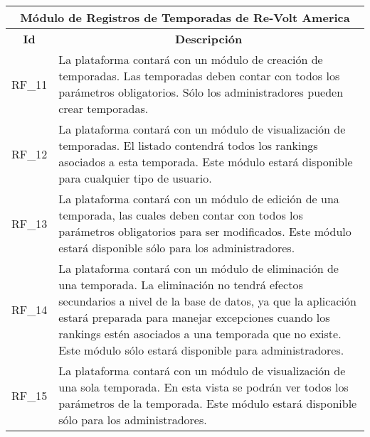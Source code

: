 \begin{center}
	\begin{tabular}{ | l | p{15cm} |}
		\hline
		\multicolumn{2}{|c|}{\textbf{Módulo de Registros de Temporadas de Re-Volt America}} \\
		\hline
		\multicolumn{1}{|c|}{\textbf{Id}} & \multicolumn{1}{|c|}{\textbf{Descripción}} \\
		\hline
		RF\_11 & La plataforma contará con un módulo de creación de temporadas. Las temporadas deben contar con todos los parámetros obligatorios. Sólo los administradores pueden crear temporadas. \\ \hline
		
		RF\_12 & La plataforma contará con un módulo de visualización de temporadas. El listado contendrá todos los rankings asociados a esta temporada. Este módulo estará disponible para cualquier tipo de usuario. \\ \hline
		
		RF\_13 & La plataforma contará con un módulo de edición de una temporada, las cuales deben contar con todos los parámetros obligatorios para ser modificados. Este módulo estará disponible sólo para los administradores. \\ \hline
		
		RF\_14 & La plataforma contará con un módulo de eliminación de una temporada. La eliminación no tendrá efectos secundarios a nivel de la base de datos, ya que la aplicación estará preparada para manejar excepciones cuando los rankings estén asociados a una temporada que no existe. Este módulo sólo estará disponible para administradores. \\ \hline
		
		RF\_15 & La plataforma contará con un módulo de visualización de una sola temporada. En esta vista se podrán ver todos los parámetros de la temporada. Este módulo estará disponible sólo para los administradores. \\ \hline
	\end{tabular}
\end{center}

